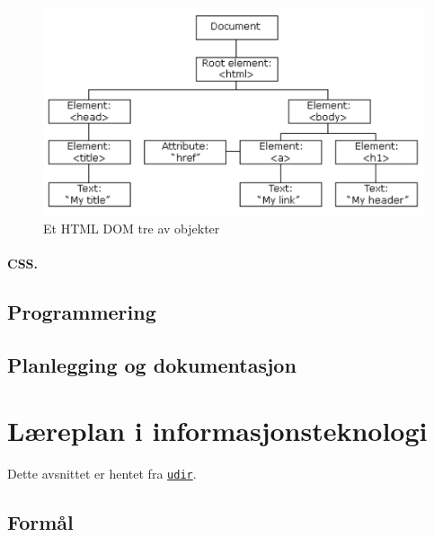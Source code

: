 \documentclass[%
oneside,                 %
final,                   %
12pt]{article}
\begin{document}
\begin{figure}[t]
  \centerline{\includegraphics[width=0.9\linewidth]{figures/pic_htmltree.pdf}}
  \caption{
  Et HTML DOM tre av objekter \label{figure:domtree}
  }
\end{figure}




\paragraph{CSS.}
\label{section:teori:css} 


\subsection{Programmering}
\label{section:teori:programmering}

\subsection{Planlegging og dokumentasjon}
\label{section:teori:planlegging}


\pagebreak

\section{Læreplan i informasjonsteknologi}

Dette avsnittet er hentet fra \href{{http://www.udir.no/kl06/inf1-01/Hele}}{\nolinkurl{udir}}.

\subsection{Formål}
\end{document}
